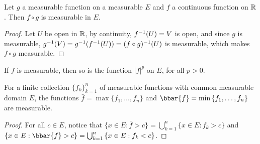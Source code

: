 \begin{lemma}\label{3.1.6}
    Let $g$ a measurable function on a measurable $E$ and  $f$ a continuous
    function on $\mathbb{R}$. Then  $f \circ g$ is measurable in  $E$.
\end{lemma}
\begin{proof}
    Let $U$ be open in  $\mathbb{R}$, by continuity,  $f^{-1}(U)=V$ is open, and since
    $g$ is measurable,  $g^{-1}(V)=g^{-1}(f^{-1}(U))=(f \circ g)^{-1}(U)$ is
    measurable, which makes $f \circ g$ measurable.
\end{proof}
\begin{corollary}
    If $f$ is measurable, then so is the function  $|f|^p$ on $E$, for all
    $p>0$.
\end{corollary}

\begin{lemma}\label{3.1.7}
    For a finite collection $\{f_k\}_{k=1}^n$ of measurable functions with
    common measurable domain $E$, the functions  $\bar{f}=\max{\{f_1, \dots,
    f_n\}}$ and $\bbar{f}=\min{\{f_1, \dots, f_n\}}$ are measurable.
\end{lemma}
\begin{proof}
    For all $c \in E$, notice that  $\{x \in E : \bar{f}>c\}=\bigcup_{k=1}^n{\{x
    \in E : f_k>c\}}$ and $\{x \in E : \bbar{f}>c\}=\bigcup_{k=1}^n{\{x
    \in E : f_k<c\}}$.
\end{proof}
